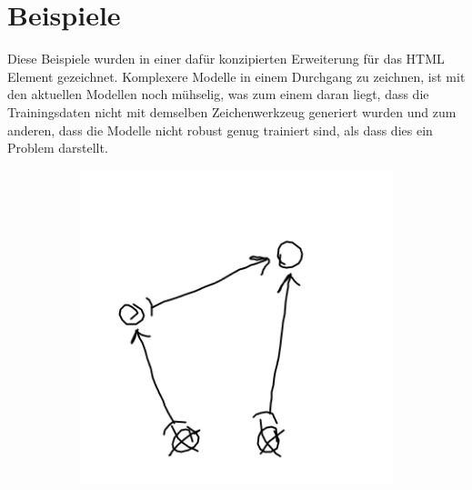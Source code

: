 \section{Beispiele}
Diese Beispiele wurden in einer dafür konzipierten Erweiterung für das  HTML Element gezeichnet.
Komplexere Modelle in einem Durchgang zu zeichnen, ist mit den aktuellen Modellen noch mühselig, was zum einem daran liegt, dass die Trainingsdaten nicht mit demselben Zeichenwerkzeug generiert wurden und zum anderen, dass die Modelle nicht robust genug trainiert sind, als dass dies ein Problem darstellt.

\begin{figure}[H]
    \centering
    \begin{subfigure}[b]{0.3\textwidth}
        \includegraphics[width=\textwidth]{images/4bar_sketch.png}
        \caption{}
        \label{fig:4bar_sketch}
    \end{subfigure}
    \begin{subfigure}[b]{0.3\textwidth}

\end{subfigure}
\end{figure}
